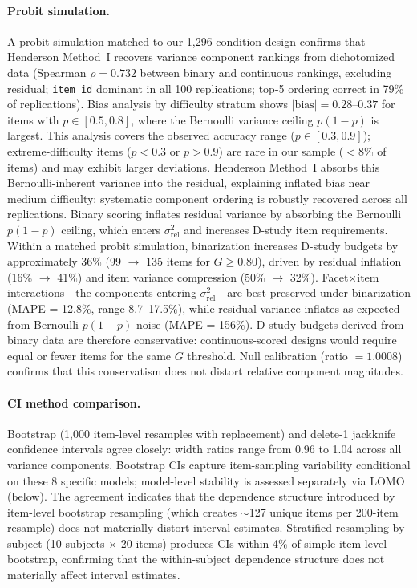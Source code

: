 \paragraph{Probit simulation.} A probit simulation matched to our 1,296-condition design confirms that Henderson Method~I recovers variance component rankings from dichotomized data (Spearman $\rho = 0.732$ between binary and continuous rankings, excluding residual; \texttt{item\_id} dominant in all 100 replications; top-5 ordering correct in 79\% of replications). Bias analysis by difficulty stratum shows $|\text{bias}| = 0.28$--$0.37$ for items with $p \in [0.5, 0.8]$, where the Bernoulli variance ceiling $p(1{-}p)$ is largest. This analysis covers the observed accuracy range ($p \in [0.3, 0.9]$); extreme-difficulty items ($p < 0.3$ or $p > 0.9$) are rare in our sample ($<$8\% of items) and may exhibit larger deviations. Henderson Method~I absorbs this Bernoulli-inherent variance into the residual, explaining inflated bias near medium difficulty; systematic component ordering is robustly recovered across all replications. Binary scoring inflates residual variance by absorbing the Bernoulli $p(1{-}p)$ ceiling, which enters $\sigma^2_\text{rel}$ and increases D-study item requirements. Within a matched probit simulation, binarization increases D-study budgets by approximately 36\% (99 $\to$ 135 items for $G \geq 0.80$), driven by residual inflation (16\% $\to$ 41\%) and item variance compression (50\% $\to$ 32\%). Facet$\times$item interactions---the components entering $\sigma^2_\text{rel}$---are best preserved under binarization (MAPE = 12.8\%, range 8.7--17.5\%), while residual variance inflates as expected from Bernoulli $p(1{-}p)$ noise (MAPE = 156\%). D-study budgets derived from binary data are therefore conservative: continuous-scored designs would require equal or fewer items for the same $G$ threshold. Null calibration (ratio $= 1.0008$) confirms that this conservatism does not distort relative component magnitudes.

\paragraph{CI method comparison.} Bootstrap (1,000 item-level resamples with replacement) and delete-1 jackknife confidence intervals agree closely: width ratios range from 0.96 to 1.04 across all variance components. Bootstrap CIs capture item-sampling variability conditional on these 8 specific models; model-level stability is assessed separately via LOMO (below). The agreement indicates that the dependence structure introduced by item-level bootstrap resampling (which creates $\sim$127 unique items per 200-item resample) does not materially distort interval estimates. Stratified resampling by subject (10 subjects $\times$ 20 items) produces CIs within 4\% of simple item-level bootstrap, confirming that the within-subject dependence structure does not materially affect interval estimates.

